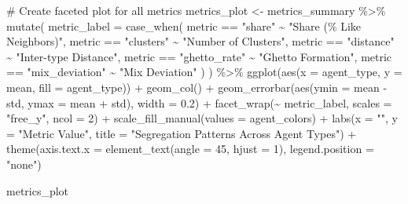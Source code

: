 \documentclass[
  11pt,
]{article}
\newenvironment{Shaded}{\begin{snugshade}}{\end{snugshade}}
\newcommand{\AttributeTok}[1]{\textcolor[rgb]{0.40,0.45,0.13}{#1}}
\newcommand{\CommentTok}[1]{\textcolor[rgb]{0.37,0.37,0.37}{#1}}
\newcommand{\DecValTok}[1]{\textcolor[rgb]{0.68,0.00,0.00}{#1}}
\newcommand{\FloatTok}[1]{\textcolor[rgb]{0.68,0.00,0.00}{#1}}
\newcommand{\FunctionTok}[1]{\textcolor[rgb]{0.28,0.35,0.67}{#1}}
\newcommand{\NormalTok}[1]{\textcolor[rgb]{0.00,0.23,0.31}{#1}}
\newcommand{\OtherTok}[1]{\textcolor[rgb]{0.00,0.23,0.31}{#1}}
\newcommand{\SpecialCharTok}[1]{\textcolor[rgb]{0.37,0.37,0.37}{#1}}
\newcommand{\StringTok}[1]{\textcolor[rgb]{0.13,0.47,0.30}{#1}}
\begin{document}
\begin{Shaded}
\begin{Highlighting}[]
\CommentTok{\# Create faceted plot for all metrics}
\NormalTok{metrics\_plot }\OtherTok{\textless{}{-}}\NormalTok{ metrics\_summary }\SpecialCharTok{\%\textgreater{}\%}
  \FunctionTok{mutate}\NormalTok{(}
    \AttributeTok{metric\_label =} \FunctionTok{case\_when}\NormalTok{(}
\NormalTok{      metric }\SpecialCharTok{==} \StringTok{"share"} \SpecialCharTok{\textasciitilde{}} \StringTok{"Share (\% Like Neighbors)"}\NormalTok{,}
\NormalTok{      metric }\SpecialCharTok{==} \StringTok{"clusters"} \SpecialCharTok{\textasciitilde{}} \StringTok{"Number of Clusters"}\NormalTok{,}
\NormalTok{      metric }\SpecialCharTok{==} \StringTok{"distance"} \SpecialCharTok{\textasciitilde{}} \StringTok{"Inter{-}type Distance"}\NormalTok{,}
\NormalTok{      metric }\SpecialCharTok{==} \StringTok{"ghetto\_rate"} \SpecialCharTok{\textasciitilde{}} \StringTok{"Ghetto Formation"}\NormalTok{,}
\NormalTok{      metric }\SpecialCharTok{==} \StringTok{"mix\_deviation"} \SpecialCharTok{\textasciitilde{}} \StringTok{"Mix Deviation"}
\NormalTok{    )}
\NormalTok{  ) }\SpecialCharTok{\%\textgreater{}\%}
  \FunctionTok{ggplot}\NormalTok{(}\FunctionTok{aes}\NormalTok{(}\AttributeTok{x =}\NormalTok{ agent\_type, }\AttributeTok{y =}\NormalTok{ mean, }\AttributeTok{fill =}\NormalTok{ agent\_type)) }\SpecialCharTok{+}
  \FunctionTok{geom\_col}\NormalTok{() }\SpecialCharTok{+}
  \FunctionTok{geom\_errorbar}\NormalTok{(}\FunctionTok{aes}\NormalTok{(}\AttributeTok{ymin =}\NormalTok{ mean }\SpecialCharTok{{-}}\NormalTok{ std, }\AttributeTok{ymax =}\NormalTok{ mean }\SpecialCharTok{+}\NormalTok{ std), }\AttributeTok{width =} \FloatTok{0.2}\NormalTok{) }\SpecialCharTok{+}
  \FunctionTok{facet\_wrap}\NormalTok{(}\SpecialCharTok{\textasciitilde{}}\NormalTok{ metric\_label, }\AttributeTok{scales =} \StringTok{"free\_y"}\NormalTok{, }\AttributeTok{ncol =} \DecValTok{2}\NormalTok{) }\SpecialCharTok{+}
  \FunctionTok{scale\_fill\_manual}\NormalTok{(}\AttributeTok{values =}\NormalTok{ agent\_colors) }\SpecialCharTok{+}
  \FunctionTok{labs}\NormalTok{(}\AttributeTok{x =} \StringTok{""}\NormalTok{, }\AttributeTok{y =} \StringTok{"Metric Value"}\NormalTok{, }
       \AttributeTok{title =} \StringTok{"Segregation Patterns Across Agent Types"}\NormalTok{) }\SpecialCharTok{+}
  \FunctionTok{theme}\NormalTok{(}\AttributeTok{axis.text.x =} \FunctionTok{element\_text}\NormalTok{(}\AttributeTok{angle =} \DecValTok{45}\NormalTok{, }\AttributeTok{hjust =} \DecValTok{1}\NormalTok{),}
        \AttributeTok{legend.position =} \StringTok{"none"}\NormalTok{)}

\NormalTok{metrics\_plot}
\end{Highlighting}
\end{Shaded}
\end{document}
